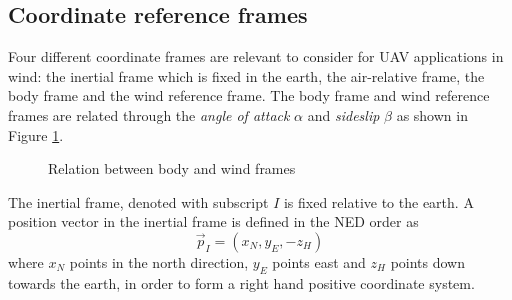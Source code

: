 \subsection{Coordinate reference frames}
Four different coordinate frames are relevant to consider for UAV applications in wind: the inertial frame which is 
fixed in the earth, the air-relative frame, the body frame and the wind reference frame. The body frame and wind reference frames are related through the \textit{angle of attack} $\alpha$ and \textit{sideslip} $\beta$
 as shown in Figure \ref{fig:body_wind_frame}.
\begin{figure}
    \begin{center}
    \end{center}
    \caption{Relation between body and wind frames}
    \label{fig:body_wind_frame}
\end{figure}

\begin{definition}
    The inertial frame, denoted with subscript $I$ is fixed relative to the earth.
    A position vector in the inertial frame is defined in the NED order as
    \begin{equation}
        \vec{p}_I = (x_N, y_E, -z_H)
    \end{equation}
    where $x_N$ points in the north direction, $y_E$ points east and $z_H$ points down towards the earth,
    in order to form a right hand positive coordinate system.
\end{definition}

